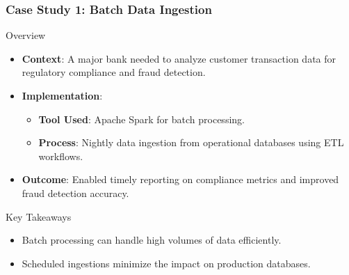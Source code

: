 \documentclass[aspectratio=169]{beamer}
\begin{document}
\begin{frame}[fragile]
    \frametitle{Case Study 1: Batch Data Ingestion}
    \begin{block}{Overview}
        \begin{itemize}
            \item \textbf{Context}: A major bank needed to analyze customer transaction data for regulatory compliance and fraud detection.
            \item \textbf{Implementation}:
                \begin{itemize}
                    \item \textbf{Tool Used}: Apache Spark for batch processing.
                    \item \textbf{Process}: Nightly data ingestion from operational databases using ETL workflows.
                \end{itemize}
            \item \textbf{Outcome}: Enabled timely reporting on compliance metrics and improved fraud detection accuracy.
        \end{itemize}
    \end{block}
    
    \begin{block}{Key Takeaways}
        \begin{itemize}
            \item Batch processing can handle high volumes of data efficiently.
            \item Scheduled ingestions minimize the impact on production databases.
        \end{itemize}
    \end{block}
\end{frame}
\end{document}
